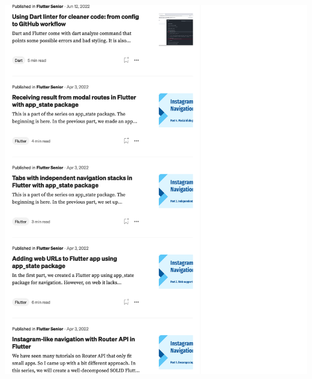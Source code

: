 \Continuing
\begin{center}
    \includegraphics[width=40em]{medium-articles-p11}
\end{center}
\WillContinue
\pagebreak

